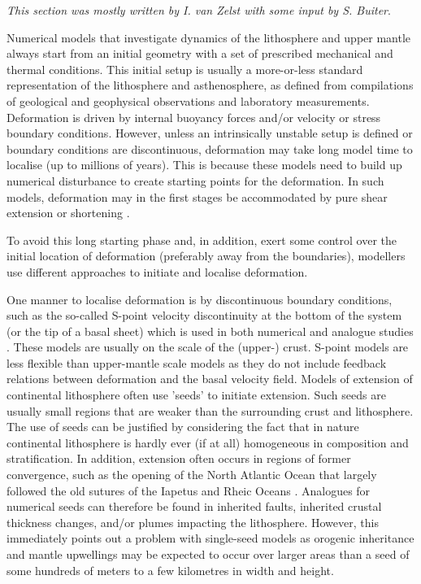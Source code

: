 
{\sl This section was mostly written by I. van Zelst with some input by S. Buiter}. 

Numerical models that investigate dynamics of the lithosphere and upper mantle always
start from an initial geometry with a set of prescribed mechanical and thermal conditions. 
This initial setup is usually a more-or-less standard representation of the
lithosphere and asthenosphere, as defined from compilations of geological and geophysical 
observations and laboratory measurements. Deformation is driven by internal buoyancy
forces and/or velocity or stress boundary conditions. However, unless an 
intrinsically unstable setup is defined or boundary conditions are discontinuous, 
deformation may take long model time to localise (up to millions of years). 
This is because these models need to build up numerical disturbance to create starting 
points for the deformation. In such models, deformation may in the first stages be
accommodated by pure shear extension or shortening \cite{pybf00,moql07}. 

To avoid this long starting phase and, in addition, exert some control 
over the initial location of deformation (preferably away from the boundaries), modellers 
use different approaches to initiate and localise deformation.

One manner to localise deformation is by discontinuous boundary conditions, such 
as the so-called S-point velocity discontinuity at the bottom of the system 
(or the tip of a basal sheet) which is used in both numerical 
\cite{brbe95,elfb95,will99a,bemh00,bube06,thfb08,brya10}
and analogue studies \cite{bube06,mime00}.
These models are usually on the scale of the (upper-) crust. 
S-point models are less flexible than upper-mantle scale models as they do not include
feedback relations between deformation and the basal velocity field.
Models of extension of continental lithosphere often use 'seeds' to initiate
extension. Such seeds are usually small regions that are weaker than the surrounding crust
and lithosphere. The use of seeds can be justified by considering the fact that in
nature continental lithosphere is hardly ever (if at all) homogeneous in composition 
and stratification. In addition, extension often occurs in regions of former
convergence, such as the opening of the North Atlantic Ocean that largely followed the old 
sutures of the Iapetus and Rheic Oceans \cite{wils66}. Analogues for numerical seeds 
can therefore be found in inherited faults, inherited crustal thickness changes, and/or 
plumes impacting the lithosphere. However, this immediately points out a problem with 
single-seed models as orogenic inheritance and mantle upwellings may be expected to 
occur over larger areas than a seed of some hundreds of meters to a few kilometres 
in width and height.

